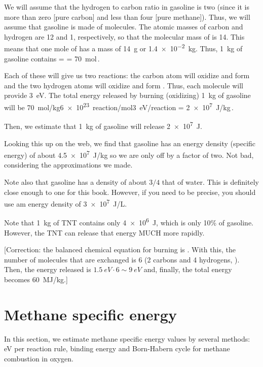 We will assume that the hydrogen to carbon ratio in gasoline is two (since it is more than zero [pure carbon] and less than four [pure methane]). Thus, we will assume that gasoline is made of  molecules. The atomic masses of carbon and hydrogen are 12 and 1, respectively, so that the molecular mass of  is 14. This means that one mole of  has a mass of \SI{14}{g} or \SI{1.4e-2}{kg}. Thus, \SI{1}{kg} of gasoline contains
%
\beq
    \npart =   = \SI{70}{mol}\,. 
\eeq

Each of these   will give us two reactions: the carbon atom will oxidize and form  and the two hydrogen atoms will oxidize and form . Thus, each  molecule will provide \SI{3}{eV}. The total energy released by burning (oxidizing) \SI{1}{kg} of gasoline will be
%
\beq
    \SI{70}{mol/kg}\cdot\SI{6e23}{reaction/mol}\cdot\SI{3}{eV/reaction} = \SI{2e7}{J/kg}\,.
\eeq

Then, we estimate that \SI{1}{kg} of gasoline will release \SI{2e7}{J}.

Looking this up on the web, we find that gasoline has an energy density \sic (specific energy) of about \SI{4.5e7}{J/kg} so we are only off by a factor of two. Not bad, considering the approximations we made.

Note also that gasoline has a density of about $3/4$ that of water. This is definitely close enough to one for this book. However, if you need to be precise, you should use am energy density of \SI{3e7}{J/L}.

Note that \SI{1}{kg} of TNT contains only \SI{4e6}{J}, which is only 10\% of gasoline. However, the TNT can release that energy MUCH more rapidly.

[Correction: the balanced chemical equation for  burning is . With this, the number of molecules that are exchanged is 6 (2 carbons and 4 hydrogens, ). Then, the energy released is $\SI{1.5}{eV}\cdot 6\sim\SI{9}{eV}$ and, finally, the total energy becomes \SI{60}{MJ/kg}.]


\section*{Methane specific energy}
%
In this section, we estimate methane specific energy values by several methods: eV per reaction rule, binding energy and Born-Habern cycle for methane combustion in oxygen.


